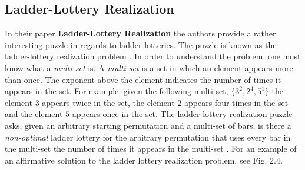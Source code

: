 

\subsection{Ladder-Lottery Realization}

In their paper \textbf{Ladder-Lottery Realization} the authors provide 
a rather interesting puzzle in regards to ladder lotteries. The puzzle 
is known as the ladder-lottery realization problem \cite{A3}. In order to understand
the problem, one must know what a \emph{multi-set} is. A \emph{multi-set}
is a set in which an element appears more than once. The exponent 
above the element indicates the number of times it appears in the set.
For example, given the following multi-set, $\{3^{2}, 2^{4}, 5^{1}\}$ 
the element $3$ appears twice in the set, the element $2$ appears four times
in the set and the element $5$ appears once in the set.
The ladder-lottery realization puzzle asks, given an arbitrary starting permutation 
and a multi-set of bars, 
is there a \emph{non-optimal} ladder lottery for the arbitrary permutation
that uses every bar in the multi-set the number 
of times it appears in the  multi-set \cite{A3}. 
For an example of an affirmative solution to the ladder lottery realization problem, see Fig. 2.4.


